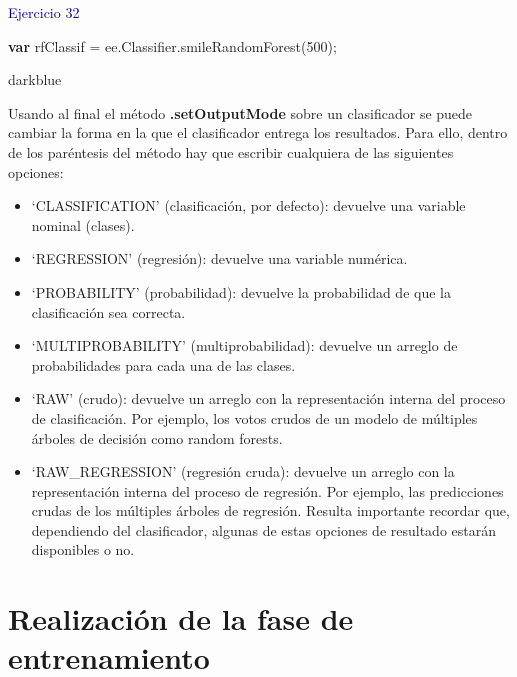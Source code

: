 \documentclass[
  12pt,
  letterpaper,
  twoside]{book}
\newenvironment{Shaded}{\begin{snugshade}}{\end{snugshade}}
\newcommand{\AttributeTok}[1]{\textcolor[rgb]{0.48,0.12,0.64}{#1}}
\newcommand{\ControlFlowTok}[1]{\textcolor[rgb]{0.00,0.00,0.00}{\textbf{#1}}}
\newcommand{\DecValTok}[1]{\textcolor[rgb]{0.28,0.53,0.93}{#1}}
\newcommand{\FunctionTok}[1]{\textcolor[rgb]{0.48,0.12,0.64}{#1}}
\newcommand{\KeywordTok}[1]{\textcolor[rgb]{0.48,0.12,0.64}{#1}}
\newcommand{\NormalTok}[1]{#1}
\newcommand{\OperatorTok}[1]{\textcolor[rgb]{0.00,0.00,0.00}{#1}}
\providecommand{\tightlist}{%
  \setlength{\itemsep}{0pt}\setlength{\parskip}{0pt}}
\newcommand\boldpurple[1]{\textcolor{darkpurple}{\textbf{#1}}}
\begin{document}
\textcolor{darkblue}{Ejercicio 32}

\begin{Shaded}
\begin{Highlighting}[]
\ControlFlowTok{var}\NormalTok{ rfClassif }\OperatorTok{=} \KeywordTok{ee}\OperatorTok{.}\AttributeTok{Classifier}\OperatorTok{.}\FunctionTok{smileRandomForest}\NormalTok{(}\DecValTok{500}\NormalTok{)}\OperatorTok{;}
\end{Highlighting}
\end{Shaded}

\begin{bluebox2}

\begin{awesomeblock}{5pt}{\faLightbulb}{darkblue}

Usando al final el método \boldpurple{.setOutputMode} sobre un clasificador se puede cambiar la forma en la que el clasificador entrega los resultados. Para ello, dentro de los paréntesis del método hay que escribir cualquiera de las siguientes opciones:

\begin{itemize}
\tightlist
\item
  `CLASSIFICATION' (clasificación, por defecto): devuelve una variable nominal (clases).
\item
  `REGRESSION' (regresión): devuelve una variable numérica.
\item
  `PROBABILITY' (probabilidad): devuelve la probabilidad de que la clasificación sea correcta.
\item
  `MULTIPROBABILITY' (multiprobabilidad): devuelve un arreglo de probabilidades para cada una de las clases.
\item
  `RAW' (crudo): devuelve un arreglo con la representación interna del proceso de clasificación. Por ejemplo, los votos crudos de un modelo de múltiples árboles de decisión como random forests.
\item
  `RAW\_REGRESSION' (regresión cruda): devuelve un arreglo con la representación interna del proceso de regresión. Por ejemplo, las predicciones crudas de los múltiples árboles de regresión.
  Resulta importante recordar que, dependiendo del clasificador, algunas de estas opciones de resultado estarán disponibles o no.
\end{itemize}

\end{awesomeblock}

\end{bluebox2}

\hypertarget{realizaciuxf3n-de-la-fase-de-entrenamiento}{%
\section{Realización de la fase de entrenamiento}\label{realizaciuxf3n-de-la-fase-de-entrenamiento}}
\end{document}
